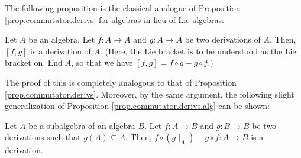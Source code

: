 \documentclass[etingof-lie.tex]{subfiles}
\begin{document}
The following proposition is the classical analogue of Proposition
\ref{prop.commutator.derivs} for algebras in lieu of Lie algebras:

\begin{proposition}
\label{prop.commutator.derivs.alg}Let $A$ be an algebra. Let $f:A\rightarrow
A$ and $g:A\rightarrow A$ be two derivations of $A$. Then, $\left[
f,g\right]  $ is a derivation of $A$. (Here, the Lie bracket is to be
understood as the Lie bracket on $\operatorname*{End}A$, so that we have
$\left[  f,g\right]  =f\circ g-g\circ f$.)
\end{proposition}

The proof of this is completely analogous to that of Proposition
\ref{prop.commutator.derivs}. Moreover, by the same argument, the following
slight generalization of Proposition \ref{prop.commutator.derivs.alg} can be shown:

\begin{proposition}
\label{prop.commutator.derivs.alg.2}Let $A$ be a subalgebra of an algebra $B$.
Let $f:A\rightarrow B$ and $g:B\rightarrow B$ be two derivations such that
$g\left(  A\right)  \subseteq A$. Then, $f\circ\left(  g\mid_{A}\right)
-g\circ f:A\rightarrow B$ is a derivation.
\end{proposition}
\end{document}
